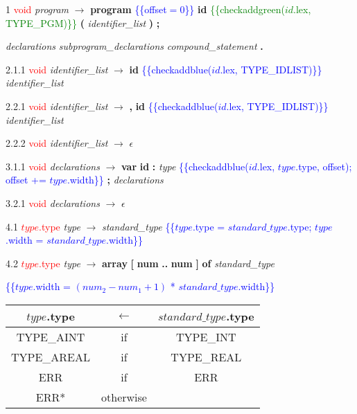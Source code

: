 
 1    \textcolor{red}{void} \emph{program} $\rightarrow$ \textbf{program} \textcolor{blue}{\{\{offset$ = 0$\}\}} \textbf{id} \textcolor{green}{\{\{checkaddgreen($id$.lex, TYPE_PGM)\}\}} \textbf{(} \emph{identifier\_list} \textbf{)} \textbf{;}

 \emph{declarations} \emph{subprogram\_declarations}  \emph{compound\_statement} \textbf{.}


2.1.1  \textcolor{red}{void} \emph{identifier\_list} $\rightarrow$ \textbf{id} \textcolor{blue}{\{\{checkaddblue($id$.lex, TYPE_IDLIST)\}\}} \emph{identifier\_list\textprime}

2.2.1  \textcolor{red}{void} \emph{identifier\_list\textprime} $\rightarrow$ \textbf{,} \textbf{id} \textcolor{blue}{\{\{checkaddblue($id$.lex, TYPE_IDLIST)\}\}} \emph{identifier\_list\textprime}

2.2.2  \textcolor{red}{void} \emph{identifier\_list\textprime} $\rightarrow$ $\epsilon$

3.1.1  \textcolor{red}{void} \emph{declarations} $\rightarrow$ \textbf{var} \textbf{id} \textbf{:} \emph{type} \textcolor{blue}{\{\{checkaddblue($id$.lex, $type$.type, offset); offset += $type$.width\}\}} \textbf{;} \emph{declarations}

3.2.1 \textcolor{red}{void} \emph{declarations} $\rightarrow$ $\epsilon$

4.1  \textcolor{red}{$type$.type} \emph{type} $\rightarrow$ \emph{standard\_type} \textcolor{blue}{\{\{$type$.type = $standard\_type$.type; $type$.width = $standard\_type$.width\}\}}

4.2  \textcolor{red}{$type$.type} \emph{type} $\rightarrow$ \textbf{array} \textbf{[} \textbf{num} \textbf{..} \textbf{num} \textbf{]} \textbf{of} \emph{standard\_type}

\textcolor{blue}{\{\{$type$.width = $(num_2 - num_1 + 1)$ * $standard\_type$.width\}\}}

\begin{tabular}[t]{|ccc|}

  \hline

  $type$.type & \textbf{$\leftarrow$} & $standard\_type$.type \\

  \hline
                                                                                                                                              TYPE_AINT & if & TYPE_INT\\
  TYPE_AREAL & if & TYPE_REAL \\

  ERR & if & ERR \\

  ERR* & otherwise & \\

  \hline

                                                                                                                                            \end{tabular}




